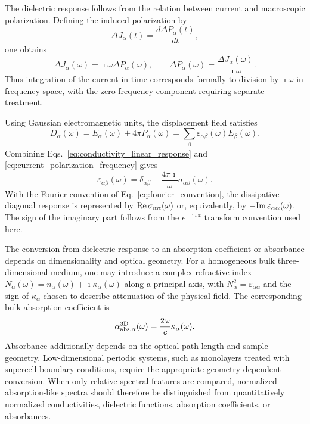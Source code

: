 The dielectric response follows from the relation between current and
macroscopic polarization.  Defining the induced polarization by
\begin{equation}
  \Delta J_\alpha(t)
  =
  \frac{d\Delta P_\alpha(t)}{dt},
  \label{eq:current_polarization_time}
\end{equation}
one obtains
\begin{equation}
  \Delta J_\alpha(\omega)
  =
  \imath\omega\Delta P_\alpha(\omega),
  \qquad
  \Delta P_\alpha(\omega)
  =
  \frac{\Delta J_\alpha(\omega)}{\imath\omega}.
  \label{eq:current_polarization_frequency}
\end{equation}
Thus integration of the current in time corresponds formally to division
by $\imath\omega$ in frequency space, with the zero-frequency component
requiring separate treatment.

Using Gaussian electromagnetic units, the displacement field satisfies
\begin{equation}
  D_\alpha(\omega)
  =
  E_\alpha(\omega)
  +
  4\pi P_\alpha(\omega)
  =
  \sum_\beta
  \varepsilon_{\alpha\beta}(\omega)E_\beta(\omega).
  \label{eq:gaussian_displacement_field}
\end{equation}
Combining Eqs.~\eqref{eq:conductivity_linear_response} and
\eqref{eq:current_polarization_frequency} gives
\begin{equation}
  \varepsilon_{\alpha\beta}(\omega)
  =
  \delta_{\alpha\beta}
  -
  \frac{4\pi\imath}{\omega}
  \sigma_{\alpha\beta}(\omega).
  \label{eq:dielectric_from_conductivity}
\end{equation}
With the Fourier convention of Eq.~\eqref{eq:fourier_convention}, the
dissipative diagonal response is represented by
${\rm Re}\,\sigma_{\alpha\alpha}(\omega)$ or, equivalently, by
$-{\rm Im}\,\varepsilon_{\alpha\alpha}(\omega)$.  The sign of the
imaginary part follows from the $e^{-\imath\omega t}$ transform
convention used here.

The conversion from dielectric response to an absorption coefficient or
absorbance depends on dimensionality and optical geometry.  For a
homogeneous bulk three-dimensional medium, one may introduce a complex
refractive index
$N_\alpha(\omega)=n_\alpha(\omega)+\imath\kappa_\alpha(\omega)$ along a
principal axis, with $N_\alpha^2=\varepsilon_{\alpha\alpha}$ and the
sign of $\kappa_\alpha$ chosen to describe attenuation of the physical
field.  The corresponding bulk absorption coefficient is
\begin{equation}
  \alpha_{{\rm abs},\alpha}^{\rm 3D}(\omega)
  =
  \frac{2\omega}{c}\kappa_\alpha(\omega).
  \label{eq:bulk_absorption_coefficient}
\end{equation}
Absorbance additionally depends on the optical path length and sample
geometry.  Low-dimensional periodic systems, such as monolayers treated
with supercell boundary conditions, require the appropriate
geometry-dependent conversion.  When only relative spectral features are
compared, normalized absorption-like spectra should therefore be
distinguished from quantitatively normalized conductivities, dielectric
functions, absorption coefficients, or absorbances.

